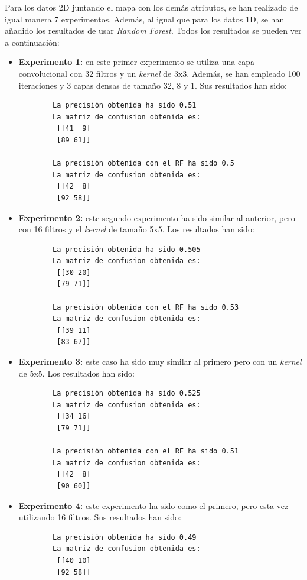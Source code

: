 Para los datos 2D juntando el mapa con los demás atributos, se han realizado de igual manera 7 experimentos. Además, al igual que para los datos 1D, se han añadido los resultados de usar \emph{Random Forest}. Todos los resultados se pueden ver a continuación:
\begin{itemize}
    \item \textbf{Experimento 1:} en este primer experimento se utiliza una capa convolucional con 32 filtros y un \emph{kernel} de 3x3. Además, se han empleado 100 iteraciones y 3 capas densas de tamaño 32, 8 y 1. Sus resultados han sido: 
    \begin{verbatim}
        La precisión obtenida ha sido 0.51
        La matriz de confusion obtenida es:
         [[41  9]
         [89 61]]
        
        La precisión obtenida con el RF ha sido 0.5
        La matriz de confusion obtenida es:
         [[42  8]
         [92 58]]
    \end{verbatim}
    \item \textbf{Experimento 2:} este segundo experimento ha sido similar al anterior, pero con 16 filtros y el \emph{kernel} de tamaño 5x5. Los resultados han sido:
    \begin{verbatim}
        La precisión obtenida ha sido 0.505
        La matriz de confusion obtenida es:
         [[30 20]
         [79 71]]
        
        La precisión obtenida con el RF ha sido 0.53
        La matriz de confusion obtenida es:
         [[39 11]
         [83 67]]
    \end{verbatim}
    \item \textbf{Experimento 3:} este caso ha sido muy similar al primero pero con un \emph{kernel} de 5x5. Los resultados han sido:
    \begin{verbatim}
        La precisión obtenida ha sido 0.525
        La matriz de confusion obtenida es:
         [[34 16]
         [79 71]]
        
        La precisión obtenida con el RF ha sido 0.51
        La matriz de confusion obtenida es:
         [[42  8]
         [90 60]]
    \end{verbatim}
    \item \textbf{Experimento 4:} este experimento ha sido como el primero, pero esta vez utilizando 16 filtros. Sus resultados han sido:
    \begin{verbatim}
        La precisión obtenida ha sido 0.49
        La matriz de confusion obtenida es:
         [[40 10]
         [92 58]]
        

\end{verbatim}
\end{itemize}
